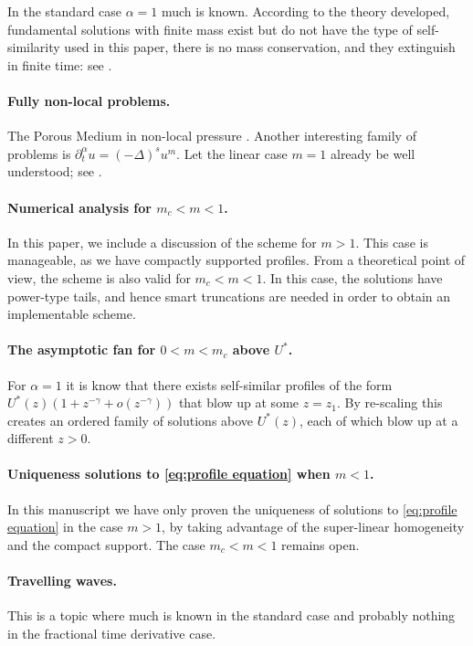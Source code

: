 \documentclass[a4paper]{article}
\theoremstyle{definition}
\begin{document}
In the standard case $\alpha=1$ much is known. According to the theory developed, fundamental solutions with finite mass exist but do not have the type of self-similarity used in this paper, there is no mass conservation, and they extinguish in finite time: see \cite{chasseigne2002theory,Vazquez2006,Vazquez2006a, vazquez2017, bonforte2010sharp}. \normalcolor

\paragraph{Fully non-local problems.}
The Porous Medium in non-local pressure \cite{allen2016}.
Another interesting family of problems is $\partial_t^\alpha u = (-\Delta)^s u^m$. Let the linear case $m = 1$ already be well understood; see \cite{cortazarLargeTimeBehaviorFully2021}.

\paragraph{Numerical analysis for $m_c < m < 1$.}
In this paper, we include a discussion of the scheme for $m > 1$. This case is manageable, as we have compactly supported profiles. From a theoretical point of view, the scheme is also valid for $m_c < m < 1$. In this case, the solutions have power-type tails, and hence smart truncations are needed in order to obtain an implementable scheme.

\paragraph{The asymptotic fan for $0 < m < m_c$ above $U^*$.}
For $\alpha = 1$ it is know that there exists self-similar profiles of the form $U^*(z) ( 1 + z^{-\gamma} + o(z^{-\gamma}))$ that blow up at some $z = z_1$. By re-scaling this creates an ordered family of solutions above $U^*(z)$, each of which blow up at a different $z > 0$.

\paragraph{Uniqueness solutions to \eqref{eq:profile equation} when $m < 1$.}
In this manuscript we have only proven the uniqueness of solutions to \eqref{eq:profile equation} in the case $m > 1$, by taking advantage of the super-linear homogeneity and the compact support. The case $m_c < m < 1$ remains open.

\paragraph{Travelling waves.}  
This is a topic where much is known in the standard case and probably nothing in the fractional time derivative case.\normalcolor
\end{document}
